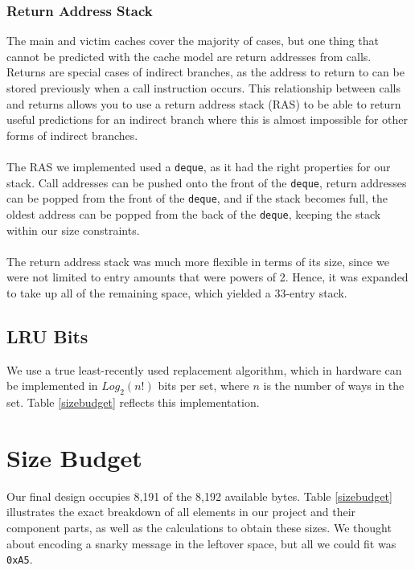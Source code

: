 \documentclass[twocolumn]{article}
\begin{document}
\subsubsection{Return Address Stack}
The main and victim caches cover the majority of cases, but one thing that cannot be predicted with the cache model are return addresses from calls. Returns are special cases of indirect branches, as the address to return to can be stored previously when a call instruction occurs. This relationship between calls and returns allows you to use a return address stack (RAS) to be able to return useful predictions for an indirect branch where this is almost impossible for other forms of indirect branches.\\\\ 
The RAS we implemented used a \texttt{deque}, as it had the right properties for our stack. Call addresses can be pushed onto the front of the \texttt{deque}, return addresses can be popped from the front of the \texttt{deque}, and if the stack becomes full, the oldest address can be popped from the back of the \texttt{deque}, keeping the stack within our size constraints.\\\\
The return address stack was much more flexible in terms of its size, since we were not limited to entry amounts that were powers of 2.  Hence, it was expanded to take up all of the remaining space, which yielded a 33-entry stack.
\subsection{LRU Bits}
We use a true least-recently used replacement algorithm, which in hardware can be implemented in $Log_2(n!)$ bits per set, where $n$ is the number of ways in the set.  Table \ref{sizebudget} reflects this implementation.
\section{Size Budget}
Our final design occupies 8,191 of the 8,192 available bytes. Table \ref{sizebudget} illustrates the exact breakdown of all elements in our project and their component parts, as well as the calculations to obtain these sizes.  We thought about encoding a snarky message in the leftover space, but all we could fit was \texttt{0xA5}.
\end{document}
